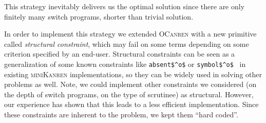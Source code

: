 This strategy inevitably delivers us the optimal solution since there are only finitely many switch programs, shorter than trivial solution.

In order to implement this strategy we extended \textsc{OCanren} with a new primitive called \emph{structural constraint}, which may
fail on some terms depending on some criterion specified by an end-user. Structural constraints can be seen as a generalization of
some known constraints like \lstinline|absent$^o$| or \lstinline|symbol$^o$|~\cite{Untagged} in existing \textsc{miniKanren} implementations, 
so they can be widely used in solving other problems as well. Note, we could implement other constraints we considered (on the
depth of switch programs, on the type of scrutinee) as structural. However, our experience has shown that this leads to
a less efficient implementation. Since these constraints are inherent to the problem, we kept them ``hard coded''.

